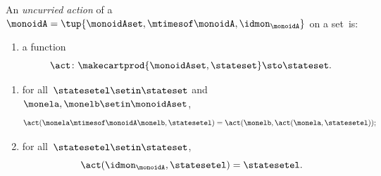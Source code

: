 \begin{ctdefinition}
\label{def:uncurried-action}
   
    An \emph{uncurried action} of a ~$\monoidA = \tup{\monoidAset, \mtimesof\monoidA, \idmon_\monoidA}$ on a set~\stateset is:
    
    \constit
    \begin{enumerate}
        \item a function
              \begin{equation}
                  \label{eq:ract-monoid}
                  \act \colon \makecartprod{\monoidAset, \stateset} \sto \stateset.
              \end{equation}
    \end{enumerate}
    \condit
    \begin{enumerate}
        \item for all~$\statesetel \setin \stateset$ and $\monela,\monelb\setin\monoidAset$,
              \begin{equation}
                  \label{eq:monoiad-ract-1cond}
                  \act(\monela \mtimesof\monoidA \monelb, \statesetel) = \act(\monelb, \act(\monela, \statesetel));
              \end{equation}
        \item for all~$\statesetel \setin \stateset$,
              \begin{equation}
                  \label{eq:monoiad-ract-2cond}
                  \act(\idmon_\monoidA, \statesetel) = \statesetel.
              \end{equation}
    \end{enumerate}
\end{ctdefinition}

